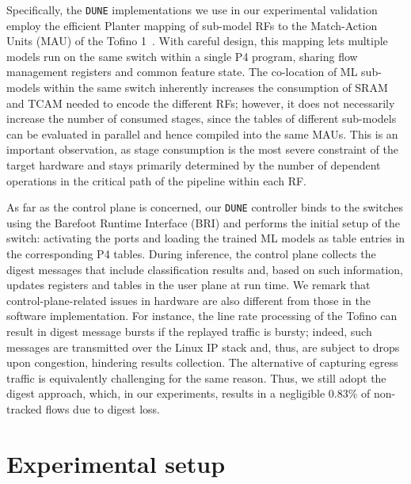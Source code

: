 \documentclass[journal]{IEEEtran}
\theoremstyle{plain} %
\newcommand{\bb}[1]{\textcolor{orange}{[Beyza: #1]}}
\newcommand{\name}{\texttt{\fontsize{9}{11}\selectfont DUNE}\xspace}
\begin{document}
Specifically, the \name implementations we use in our experimental validation employ the efficient Planter mapping of sub-model RFs to the Match-Action Units (MAU) of the Tofino 1~\cite{Planter.2021}.
With careful design, this mapping lets multiple models run on the same switch within a single P4 program, sharing flow management registers and common feature state.
The co-location of ML sub-models within the same switch 
inherently increases the consumption of SRAM and TCAM needed to encode the different RFs; however, it does not necessarily increase the number of consumed stages, since the tables of different sub-models can be evaluated in parallel and hence compiled into the same MAUs.
This is an important observation, as stage consumption is the most severe constraint of the target hardware and stays primarily determined by the number of dependent operations in the critical path of the pipeline within each RF.

As far as the control plane is concerned, our \name controller binds to the switches using the Barefoot Runtime Interface (BRI) and performs the initial setup of the switch: activating the ports and loading the trained ML models as table entries in the corresponding P4 tables.
During inference, the control plane collects the digest messages that include classification results and, based on such information, updates registers and tables in the user plane at run time.
We remark that control-plane-related issues in hardware are also different from those in the software implementation.
For instance, the line rate processing of the Tofino can result in digest message bursts if the replayed traffic is bursty; indeed, such messages are transmitted over the Linux IP stack and, thus, are subject to drops upon congestion, hindering results collection.
The alternative of capturing egress traffic is equivalently challenging for the same reason.
Thus, we still adopt the digest approach, which, in our experiments, results in a negligible 0.83\% of non-tracked flows due to digest loss.

\section{Experimental setup}
\label{sec:experimental-setup}
\end{document}

